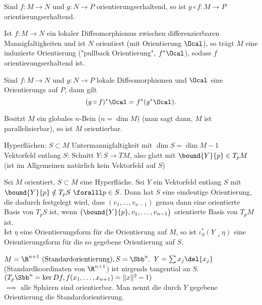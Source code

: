 \begin{rem*}
	Sind \( f: M \to N \) und \( g: N \to P \) orientierungserhaltend, so ist \( g \circ f: M \to P \) orientierungserhaltend.
\end{rem*}

\begin{lem}
	Ist \( f:M \to N \) ein lokaler Diffeomorphismus zwischen differenzierbaren Mannigfaltigkeiten und ist $N$ orientiert (mit Orientierung $\Ocal$), so trägt $M$ eine induzierte Orientierung ("pullback Orientierung", $f^*\Ocal$), sodass $f$ orientierungserhaltend ist.
\end{lem}

\begin{rem}
	Sind $f:M \to N$ und $g: N \to P$ lokale Diffeomorphismen und $\Ocal$ eine Orientierungs auf $P$, dann gilt
	\[ (g\circ f) ^* \Ocal = f^*(g^*\Ocal). \]
\end{rem}

\begin{lem}
	Besitzt $M$ ein globales $n$-Bein ($n = \dim M$) (man sagt dann, $M$ ist parallelisierbar), so ist $M$ orientierbar.
\end{lem}

\noindent Hyperflächen: \( S \subset M \) Untermannigfaltigkeit mit $\dim S = \dim M -1$\\
Vektorfeld entlang $S$: Schnitt \( Y: S \to TM \), also glatt mit \( \bound{Y}{p} \in T_pM \) (ist im Allgemeinen natürlich kein Vektorfeld auf $S$)

\begin{lem}\label{8.14}
	Sei $M$ orientiert, \( S \subset M \) eine Hyperfläche. Sei \( Y \) ein Vektorfeld entlang $S$ mit \( \bound{Y}{p} \notin T_pS\ \foralll p \in S \). Dann hat $S$ eine eindeutige Orientierung, die dadurch festgelegt wird, dass \( (v_1, \dotsc, v_{n-1}) \) genau dann eine orientierte Basis von $T_pS$ ist, wenn \( \big(\bound{Y}{p},v_1,\dotsc,v_{n-1}\big) \) orientierte Basis von $T_pM$ ist.\\
	Ist $\eta$ eine Orientierungsform für die Orientierung auf $M$, so ist \( \iota_S^*(Y \lrcorner \eta) \) eine Orientierungsform für die so gegebene Orientierung auf $S$.
\end{lem}

\begin{exmp*}
\end{exmp*}

\begin{exmp*}
	\( M = \R^{n+1} \ (\text{Standardorientierung}), S = \Sbb^n. \) \( Y = \sum x_j \del{x_j} \) (Standardkoordinaten von $\R^{n+1}$) ist nirgends tangential an $S$.\\
	\( ( T_p\Sbb^n = \ker Df, f(x_1,\dotsc,x_{n+1}) = \|x\|^2-1) \)\\
	$\implies$ alle Sphären sind orientierbar. Man nennt die durch $Y$ gegebene Orientierung die Standardorientierung.
\end{exmp*}

